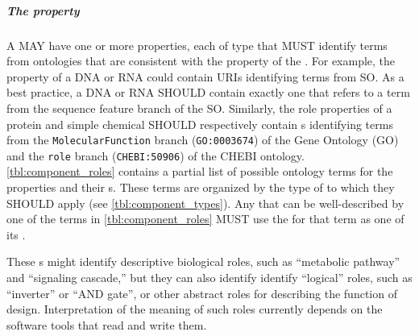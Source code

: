 \subparagraph{The  property}
\label{sec:role:CD}

A  MAY have one or more  properties, each of type  that MUST identify terms from ontologies that are consistent with the  property of the .  For example, the  property of a DNA or RNA  could contain URIs identifying terms from SO. As a best practice, a DNA or RNA  SHOULD contain exactly one  that refers to a term from the sequence feature branch of the SO.
Similarly, the role properties of a protein and simple chemical  SHOULD respectively contain s identifying terms from the \texttt{MolecularFunction} branch (\texttt{GO:0003674}) of the Gene Ontology (GO) and the \texttt{role} branch (\texttt{CHEBI:50906}) of the CHEBI ontology.
\ref{tbl:component_roles} contains a partial list of possible ontology terms for the  properties and their s. These terms are organized by the type of  to which they SHOULD apply (see \ref{tbl:component_types}). Any  that can be well-described by one of the terms in \ref{tbl:component_roles} MUST use the  for that term as one of its .

These s might identify descriptive biological roles, such as ``metabolic pathway'' and ``signaling cascade,'' but they can also identify identify ``logical'' roles, such as ``inverter'' or ``AND gate'', or other abstract roles for describing the function of design. Interpretation of the meaning of such roles currently depends on the software tools that read and write them.

